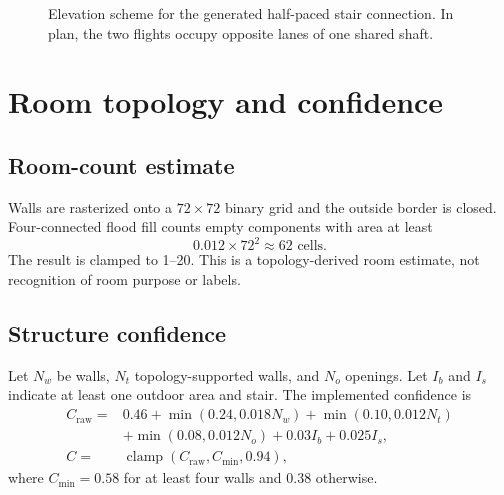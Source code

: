 \documentclass[11pt,a4paper]{article}
\newcommand{\clamp}{\operatorname{clamp}}
\begin{document}
\begin{figure}[htbp]
\centering
{}
\caption{Elevation scheme for the generated half-paced stair connection. In plan, the two flights occupy opposite lanes of one shared shaft.}
\label{fig:halfpace}
\end{figure}

\section{Room topology and confidence}

\subsection{Room-count estimate}

Walls are rasterized onto a $72\times72$ binary grid and the outside border is closed. Four-connected flood fill counts empty components with area at least
\begin{equation}
0.012\times72^2\approx62\text{ cells}.
\end{equation}
The result is clamped to 1--20. This is a topology-derived room estimate, not recognition of room purpose or labels.

\subsection{Structure confidence}

Let $N_w$ be walls, $N_t$ topology-supported walls, and $N_o$ openings. Let $I_b$ and $I_s$ indicate at least one outdoor area and stair. The implemented confidence is
\begin{align}
C_{\text{raw}}={}&0.46+\min(0.24,0.018N_w)+\min(0.10,0.012N_t)\\
&+\min(0.08,0.012N_o)+0.03I_b+0.025I_s,\\
C={}&\clamp(C_{\text{raw}},C_{\min},0.94),
\end{align}
where $C_{\min}=0.58$ for at least four walls and $0.38$ otherwise.
\end{document}
